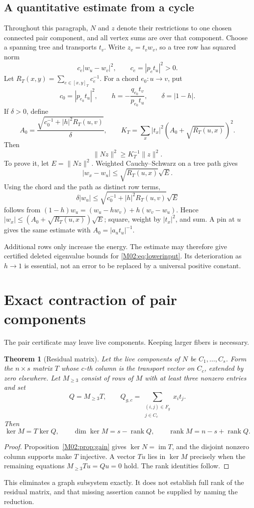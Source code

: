 \documentclass[11pt,a4paper,oneside]{report}
\newtheorem{theorem}{Theorem}[section]
\theoremstyle{definition}
\theoremstyle{remark}
\DeclareMathOperator{\rank}{rank}
\begin{document}
\subsection{A quantitative estimate from a cycle}
Throughout this paragraph, \(N\) and \(z\) denote their restrictions to one chosen connected pair component, and all vertex sums are over that component. Choose a spanning tree and transports \(t_v\). Write \(z_v=t_vw_v\), so a tree row has squared norm
\[
c_e|w_u-w_v|^2,\qquad c_e=|p_et_u|^2>0.
\]
Let \(R_T(x,y)=\sum_{e\in[x,y]_T}c_e^{-1}\). For a chord \(e_0:u\to v\), put
\[
c_0=|p_{e_0}t_u|^2,\qquad
h=-\frac{q_{e_0}t_v}{p_{e_0}t_u},\qquad \delta=|1-h|.
\]
If \(\delta>0\), define
\[
A_0=\frac{\sqrt{c_0^{-1}+|h|^2R_T(u,v)}}{\delta},
\qquad
K_T=\sum_x|t_x|^2
\left(A_0+\sqrt{R_T(u,x)}\right)^2.
\]
Then
\begin{equation}\label{M02:eq:coercivity}
\|Nz\|^2\ge K_T^{-1}\|z\|^2.
\end{equation}
To prove it, let \(E=\|Nz\|^2\). Weighted Cauchy--Schwarz on a tree path gives
\[
|w_x-w_u|\le\sqrt{R_T(u,x)}\sqrt E.
\]
Using the chord and the path as distinct row terms,
\[
\delta|w_u|
\le \sqrt{c_0^{-1}+|h|^2R_T(u,v)}\sqrt E
\]
follows from \((1-h)w_u=(w_u-hw_v)+h(w_v-w_u)\). Hence
\(|w_x|\le(A_0+\sqrt{R_T(u,x)})\sqrt E\); square, weight by \(|t_x|^2\), and sum. A pin at \(u\) gives the same estimate with \(A_0=|a_ut_u|^{-1}\).

Additional rows only increase the energy. The estimate may therefore give certified deleted eigenvalue bounds for \eqref{M02:eq:lowerinput}. Its deterioration as \(h\to1\) is essential, not an error to be replaced by a universal positive constant.

\section{Exact contraction of pair components}
The pair certificate may leave live components. Keeping larger fibers is necessary.
\begin{theorem}[Residual matrix]\label{M02:thm:residual}
Let the live components of \(N\) be \(C_1,\ldots,C_s\). Form the \(n\times s\) matrix \(T\) whose \(c\)-th column is the transport vector on \(C_c\), extended by zero elsewhere. Let \(M_{\ge3}\) consist of rows of \(M\) with at least three nonzero entries and set
\[
Q=M_{\ge3}T,\qquad
Q_{g,c}=\sum_{\substack{(i,j)\in F_g\\j\in C_c}}x_i t_j.
\]
Then
\begin{equation}\label{M02:eq:residual}
\ker M=T\ker Q,\qquad
\dim\ker M=s-\rank Q,\qquad
\rank M=n-s+\rank Q.
\end{equation}
\end{theorem}
\begin{proof}
Proposition~\ref{M02:prop:gain} gives \(\ker N=\operatorname{im}T\), and the disjoint nonzero column supports make \(T\) injective. A vector \(Tu\) lies in \(\ker M\) precisely when the remaining equations \(M_{\ge3}Tu=Qu=0\) hold. The rank identities follow.
\end{proof}
This eliminates a graph subsystem exactly. It does not establish full rank of the residual matrix, and that missing assertion cannot be supplied by naming the reduction.
\end{document}
